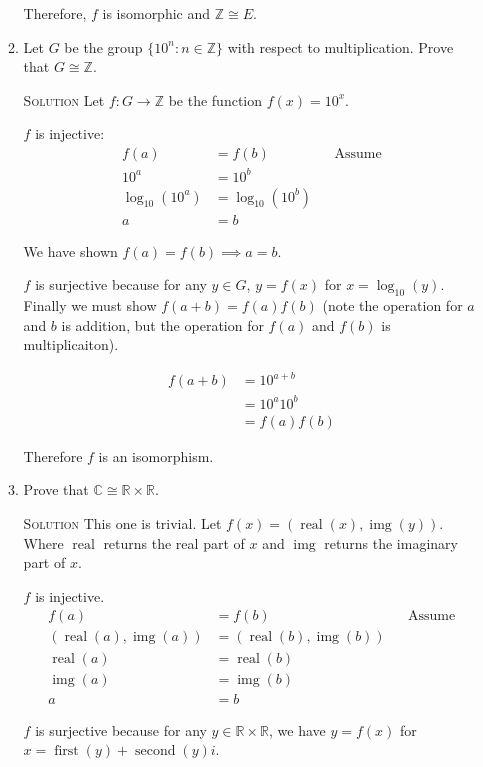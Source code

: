 \documentclass[twoside]{amsart}
\newcommand{\solution}{\textsc{Solution}\xspace}
\newcommand{\iso}{\cong}
\newcommand{\blank}{\vspace{5pt}}
\newcommand{\real}{\mathop{\mathrm{real}}}
\newcommand{\img}{\mathop{\mathrm{img}}}
\newcommand{\first}{\mathop{\mathrm{first}}}
\newcommand{\second}{\mathop{\mathrm{second}}}
\begin{document}
\begin{enumerate}[A.]
\begin{enumerate}[1]
      Therefore, $f$ is isomorphic and $\mathbb{Z} \iso E$.
      \blank
      \item Let $G$ be the group $\{10^n : n \in \mathbb{Z}\}$ with respect
      to multiplication. Prove that $G \iso \mathbb{Z}$.

      \blank \noindent \solution Let $f : G \to \mathbb{Z}$ be the function
      $f(x) = 10^x$.

      $f$ is injective:
      \begin{align*}
         f(a) &= f(b) && \text{Assume} \\
         10^a &= 10^b  \\ 
         \log_{10}(10^a) &= \log_{10}(10^b) \\
            a &= b
      \end{align*}

      We have shown $f(a)=f(b) \implies a = b$.

      $f$ is surjective because for any $y \in G$, $ y= f(x)$ for
      $x = \log_{10}(y)$. Finally we must show $f(a+b)=f(a)f(b)$ (note
      the operation for $a$ and $b$ is addition, but the operation for
      $f(a)$ and $f(b)$ is multiplicaiton).

      \begin{align*}
         f(a+b) &= 10^{a+b} \\
                &= 10^a 10^b \\
                &= f(a)f(b)
      \end{align*}

      Therefore $f$ is an isomorphism.
      
      \blank 
      \item Prove that $\mathbb{C} \iso \mathbb{R} \times \mathbb{R}$.

      \blank \noindent \solution  This one is trivial. 
      Let $f(x) = (\real(x),\img(y))$. Where $\real$ returns the real 
      part of $x$ and $\img$ returns the imaginary part of $x$.

      $f$ is injective.
      \begin{align*}
         f(a) &= f(b)  && \text{Assume} \\
         (\real(a),\img(a)) &= (\real(b),\img(b)) \\
          \real(a) &= \real(b) \\
          \img(a) &= \img(b)  \\
          a &= b
      \end{align*}

      $f$ is surjective because for any $y \in \mathbb{R} \times \mathbb{R}$,
      we have $y = f(x)$ for $x = \first(y) + \second(y)i$.


\end{enumerate}
\end{enumerate}
\end{document}
